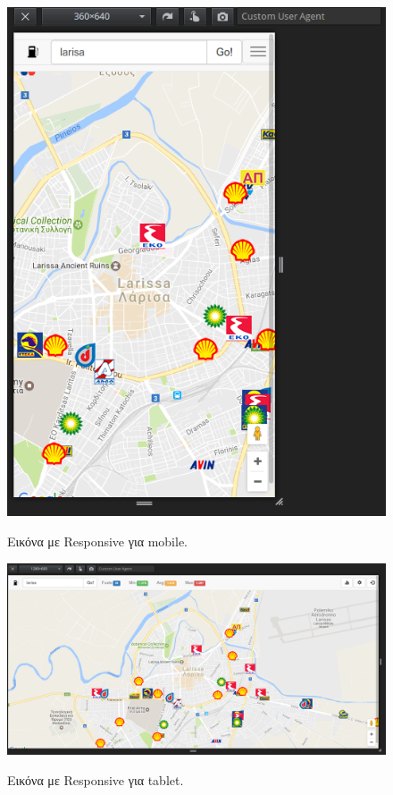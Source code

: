 \begin{figure}[H]
  \caption{Εικόνα με Responsive για mobile.}
  \centering
    \includegraphics[width=1\textwidth]{img/responsive1.png}
    \label{fig:responsive1}
\end{figure}

\begin{figure}[H]
  \caption{Εικόνα με Responsive για tablet.}
  \centering
    \includegraphics[width=1\textwidth]{img/responsive2.png}
    \label{fig:responsive2}
\end{figure}

